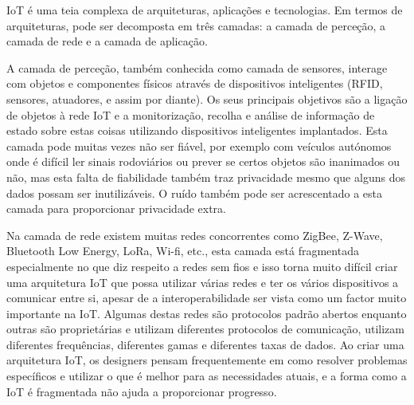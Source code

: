 \documentclass[conference]{IEEEtran}
\begin{document}
IoT é uma teia complexa de arquiteturas, aplicações e tecnologias. Em termos
de arquiteturas, pode ser decomposta em três camadas: a camada de perceção,
a camada de rede e a camada de aplicação.


A camada de perceção, também conhecida como camada de sensores, interage
com objetos e componentes físicos através de dispositivos inteligentes
(RFID, sensores, atuadores, e assim por diante). Os seus principais objetivos
são a ligação de objetos à rede IoT e a monitorização, recolha e análise de
informação de estado sobre estas coisas utilizando dispositivos inteligentes
implantados. Esta camada pode muitas vezes não ser fiável, por exemplo com
veículos autónomos onde é difícil ler sinais rodoviários ou prever se certos
objetos são inanimados ou não, mas esta falta de fiabilidade também traz
privacidade mesmo que alguns dos dados possam ser inutilizáveis. O ruído
também pode ser acrescentado a esta camada para proporcionar privacidade
extra.


Na camada de rede existem muitas redes concorrentes como ZigBee, Z-Wave,
Bluetooth Low Energy, LoRa, Wi-fi, etc., esta camada está fragmentada
especialmente no que diz respeito a redes sem fios e isso torna muito
difícil criar uma arquitetura IoT que possa utilizar várias redes e
ter os vários dispositivos a comunicar entre si, apesar de a interoperabilidade
ser vista como um factor muito importante na IoT. Algumas destas redes
são protocolos padrão abertos enquanto outras são proprietárias e utilizam
diferentes protocolos de comunicação, utilizam diferentes frequências,
diferentes gamas e diferentes taxas de dados. Ao criar uma arquitetura
IoT, os designers pensam frequentemente em como resolver problemas específicos
e utilizar o que é melhor para as necessidades atuais, e a forma como a
IoT é fragmentada não ajuda a proporcionar progresso.
\end{document}
